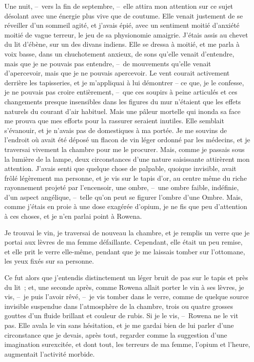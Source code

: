 \documentclass[french,twoside]{book} %
\begin{document}
Une nuit, – vers la fin de septembre, – elle attira mon attention sur ce sujet désolant avec une énergie plus vive que de coutume. Elle venait justement de se réveiller d’un sommeil agité, et j’avais épié, avec un sentiment moitié d’anxiété moitié de vague terreur, le jeu de sa physionomie amaigrie. J’étais assis au chevet du lit d’ébène, sur un des divans indiens. Elle se dressa à moitié, et me parla à voix basse, dans un chuchotement anxieux, de sons qu’elle venait d’entendre, mais que je ne pouvais pas entendre, – de mouvements qu’elle venait d’apercevoir, mais que je ne pouvais apercevoir. Le vent courait activement derrière les tapisseries, et je m’appliquai à lui démontrer – ce que, je le confesse, je ne pouvais pas croire entièrement, – que ces soupirs à peine articulés et ces changements presque insensibles dans les figures du mur n’étaient que les effets naturels du courant d’air habituel. Mais une pâleur mortelle qui inonda sa face me prouva que mes efforts pour la rassurer seraient inutiles. Elle semblait s’évanouir, et je n’avais pas de domestiques à ma portée. Je me souvins de l’endroit où avait été déposé un flacon de vin léger ordonné par les médecins, et je traversai vivement la chambre pour me le procurer. Mais, comme je passais sous la lumière de la lampe, deux circonstances d’une nature saisissante attirèrent mon attention. J’avais senti que quelque chose de palpable, quoique invisible, avait frôlé légèrement ma personne, et je vis sur le tapis d’or, au centre même du riche rayonnement projeté par l’encensoir, une ombre, – une ombre faible, indéfinie, d’un aspect angélique, – telle qu’on peut se figurer l’ombre d’une Ombre. Mais, comme j’étais en proie à une dose exagérée d’opium, je ne fis que peu d’attention à ces choses, et je n’en parlai point à Rowena.\par
Je trouvai le vin, je traversai de nouveau la chambre, et je remplis un verre que je portai aux lèvres de ma femme défaillante. Cependant, elle était un peu remise, et elle prit le verre elle-même, pendant que je me laissais tomber sur l’ottomane, les yeux fixés sur sa personne.\par
Ce fut alors que j’entendis distinctement un léger bruit de pas sur le tapis et près du lit ; et, une seconde après, comme Rowena allait porter le vin à ses lèvres, je vis, – je puis l’avoir rêvé, – je vis tomber dans le verre, comme de quelque source invisible suspendue dans l’atmosphère de la chambre, trois ou quatre grosses gouttes d’un fluide brillant et couleur de rubis. Si je le vis, – Rowena ne le vit pas. Elle avala le vin sans hésitation, et je me gardai bien de lui parler d’une circonstance que je devais, après tout, regarder comme la suggestion d’une imagination surexcitée, et dont tout, les terreurs de ma femme, l’opium et l’heure, augmentait l’activité morbide.\par
\end{document}
